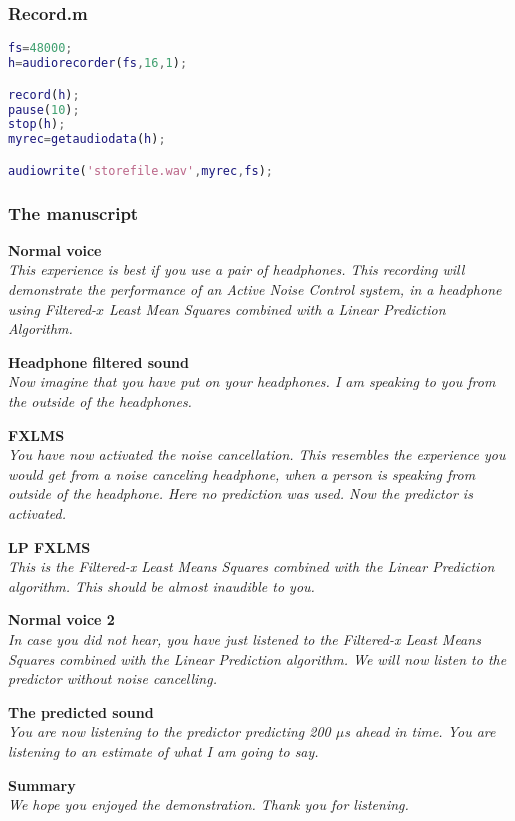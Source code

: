 \subsubsection{Record.m}
\begin{lstlisting}[language=MATLAB,caption=Record.m.]
fs=48000;
h=audiorecorder(fs,16,1);

record(h);
pause(10);
stop(h);
myrec=getaudiodata(h);

audiowrite('storefile.wav',myrec,fs);
\end{lstlisting}

\subsubsection{The manuscript}


\textbf{Normal voice}\\
\textit{This experience is best if you use a pair of headphones. 
This recording will demonstrate the performance of an Active Noise Control system, in a headphone using Filtered-$x$ Least Mean Squares combined with a Linear Prediction Algorithm. }


\textbf{Headphone filtered sound}\\
\textit{Now imagine that you have put on your headphones. I am speaking to you from the outside of the headphones.}

\textbf{FXLMS}\\
\textit{You have now activated the noise cancellation. This resembles the experience you would get from a noise canceling headphone, when a person is speaking from outside of the headphone. 
Here no prediction was used. Now the predictor is activated. }

\textbf{LP FXLMS}\\
\textit{This is the Filtered-x Least Means Squares combined with the Linear Prediction algorithm. This should be almost inaudible to you. }

\textbf{Normal voice 2}\\
\textit{In case you did not hear, you have just listened to the Filtered-x Least Means Squares combined with the Linear Prediction algorithm. We will now listen to the predictor without noise cancelling.}

\textbf{The predicted sound}\\
\textit{You are now listening to the predictor predicting 200 $\mu$s ahead in time. You are listening to an estimate of what I am going to say.}  

\textbf{Summary}\\
\textit{We hope you enjoyed the demonstration. Thank you for listening.}

